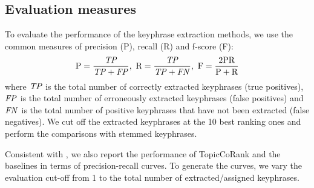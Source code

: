   \subsection{Evaluation measures}
  \label{subsec:evaluation_measures}
    To evaluate the performance of the keyphrase extraction methods, we use the
    common measures of precision (P), recall (R) and f-score (F):
    \begin{align}
        \text{P} = \frac{\text{\textit{TP}}}{\text{\textit{TP}}+\text{\textit{FP}}},\ \text{R} = \frac{\text{\textit{TP}}}{\text{\textit{TP}} + \text{\textit{FN}}},\ \text{F} = \frac{2 \text{PR}}{\text{P} + \text{R}}
    \end{align}
    where $\textnormal{\textit{TP}}$ is the total number of correctly extracted keyphrases (true positives),
    $\textnormal{\textit{FP}}$ is the total number of erroneously extracted keyphrases (false positives) and
    $\textnormal{\textit{FN}}$ is the total number of positive keyphrases that have not been extracted (false negatives).
    We cut off the extracted keyphrases at the 10 best ranking ones and perform the
    comparisons with stemmed keyphrases.
    
    Consistent with , we also report the performance of
    TopicCoRank and the baselines in terms of precision-recall curves. To generate the
    curves, we vary the evaluation cut-off from 1 to the total number of
    extracted/assigned keyphrases.

